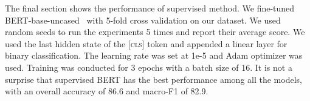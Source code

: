 \documentclass[11pt]{article}
\begin{document}
The final section shows the performance of supervised method. We fine-tuned BERT-base-uncased~\citep{devlin-etal-2019-bert} with 5-fold cross validation on our dataset. We used random seeds to run the experiments 5 times and report their average score. We used the last hidden state of the \textsc{[cls]} token and appended a linear layer for binary classification.  The learning rate was set at 1e-5 and Adam optimizer was used. Training was conducted for 3 epochs with a batch size of 16. It is not a surprise that supervised BERT has the best performance among all the models, with an overall accuracy of 86.6 and macro-F1 of 82.9.

\begin{table}[t]
    \centering
\caption{F1-score comparison of Llama-70B-CoT-2S and BERT on metonymic and non-metonymic instances across different datasets.
}
\label{table:other_datasets}
\end{table}
\end{document}
